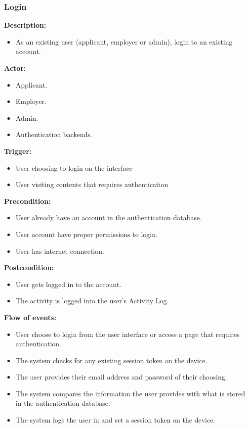 \documentclass[a4paper]{article}
\begin{document}
\subsubsection{Login}
\textbf{Description:}
\begin{itemize}
    \item As an existing user (applicant, employer or admin), login to an existing account.
\end{itemize}

\textbf{Actor:}
\begin{itemize}
    \item Applicant.
    \item Employer.
    \item Admin.
    \item Authentication backends.
\end{itemize}

\textbf{Trigger:}
\begin{itemize}
    \item User choosing to login on the interface
    \item User visiting contents that requires authentication
\end{itemize}

\textbf{Precondition:}
\begin{itemize}
    \item User already have an account in the authentication database.
    \item User account have proper permissions to login.
    \item User has internet connection.
\end{itemize}

\textbf{Postcondition:}
\begin{itemize}
    \item User gets logged in to the account.
    \item The activity is logged into the user's Activity Log.
\end{itemize}

\textbf{Flow of events:}
\begin{itemize}
    \item User choose to login from the user interface or access a page that requires authentication.
    \item The system checks for any existing session token on the device.
    \item The user provides their email address and password of their choosing.
    \item The system compares the information the user provides with what is stored in the authentication database.
    \item The system logs the user in and set a session token on the device.
\end{itemize}
\end{document}
